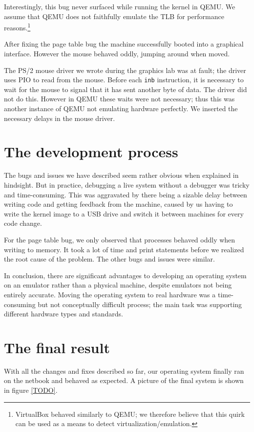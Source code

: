 \documentclass{report}
\begin{document}
Interestingly, this bug never surfaced while running the kernel in QEMU. We
assume that QEMU does not faithfully emulate the TLB for performance
reasons.\footnote{VirtualBox behaved similarly to QEMU; we therefore believe
that this quirk can be used as a means to detect virtualization/emulation.}

After fixing the page table bug the machine successfully booted into a
graphical interface. However the mouse behaved oddly, jumping around when
moved.


The PS/2 mouse driver we wrote during the graphics lab was at fault; the
driver uses PIO to read from the mouse. Before each \texttt{inb}
instruction, it is necessary to wait for the mouse to signal that it has sent
another byte of data. The driver did not do this. However in QEMU these waits
were not necessary; thus this was another instance of QEMU not emulating
hardware perfectly. We inserted the necessary delays in the mouse driver.


\section{The development process}
The bugs and issues we have described seem rather obvious when explained in
hindsight. But in practice, debugging a live system without a debugger was
tricky and time-consuming. This was aggravated by there being a sizable delay
between writing code and getting feedback from the machine, caused by us
having to write the kernel image to a USB drive and switch it between
machines for every code change.

For the page table bug, we only observed that processes behaved oddly when
writing to memory. It took a lot of time and print statements before we
realized the root cause of the problem. The other bugs and issues were
similar.

In conclusion, there are significant advantages to developing an operating
system on an emulator rather than a physical machine, despite emulators not
being entirely accurate. Moving the operating system to real hardware was a
time-consuming but not conceptually difficult process; the main task was
supporting different hardware types and standards.


\section{The final result}
With all the changes and fixes described so far, our operating system finally
ran on the netbook and behaved as expected. A picture of the final system is
shown in figure \ref{TODO}.
\end{document}
